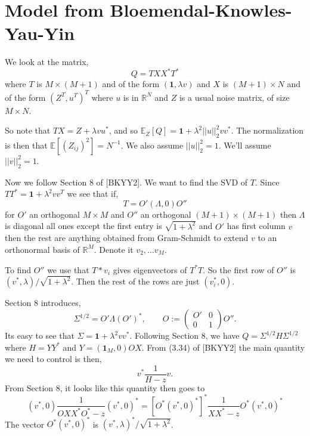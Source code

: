 \documentclass[11 pt, reqno]{article}
\def\beq{\begin{equation}}
\def\eeq{\end{equation}}
\def\rr{\mathbb{R}}
\def\1{\boldsymbol{1}}
\def\ee{\mathrm{E}}
\def\ee{\mathbb{E}}
\begin{document}
\section{Model from Bloemendal-Knowles-Yau-Yin}





We look at the matrix, 
\beq
Q = T X X^* T^*
\eeq
where $T$ is $M \times (M+1)$ and of the form $( \1, \lambda v)$ and $X$ is $(M+1) \times N$ and of the form $(Z^T, u^T)^T$ where $u$ is in $\rr^N$ and $Z$ is a usual noise matrix, of size $M \times N$.  

So note that $TX = Z + \lambda v u^*$, and so $\ee_Z [ Q ] = \1 + \lambda^2 ||u||_2^2 v v^*$.    The normalization is then that $\ee[ (Z_{ij})^2] = N^{-1}$.  We also assume $||u||_2^2 = 1$.  We'll assume $||v||_2^2 = 1$.    

Now we follow Section $8$ of [BKYY2].  We want to find the SVD of $T$.   Since $T T^* = \1 + \lambda^2 v v^T$ we see that if,
\beq
T = O' (\Lambda, 0) O''
\eeq
for $O'$ an orthogonal $M \times M$ and $O''$ an orthogonal $(M+1) \times (M+1)$ then $\Lambda$ is diagonal all ones except the first entry is $\sqrt{1+ \lambda^2}$ and $O'$ has first column $v$ then the rest are anything obtained from Gram-Schmidt to extend $v$ to an orthonormal basis of $\rr^M$.  Denote it $v_2, \dots v_M$.  

To find $O''$ we use that $T* v_i$ gives eigenvectors of $T^* T$.   So the first row of $O''$ is $(v^*, \lambda ) / \sqrt{1+\lambda^2}$.  Then the rest of the rows are just $(v_i^*, 0)$.

Section 8 introduces,
\beq
\Sigma^{1/2} = O' \Lambda (O')^*, \qquad O:= \left( \begin{matrix} O' & 0 \\ 0 & 1 \end{matrix} \right)O''.
\eeq
Its easy to see that $\Sigma = \1 + \lambda^2 v v^*$.  Following Section 8, we have $Q = \Sigma^{1/2} H \Sigma^{1/2}$ where $H = Y Y^*$ and $Y = (\1_M, 0) O X$.  
From (3.34) of [BKYY2] the main quantity we need to control is then,
\beq
v^* \frac{1}{H-z} v.
\eeq
From Section 8, it looks like this quantity then goes to
\beq
(v^*, 0) \frac{1}{ O X X^* O^* - z } (v^*, 0)^* = [ O^* ( v^*, 0)^*]^* \frac{1}{ X X^* - z } O^* ( v^*, 0)^*
\eeq
The vector $O^* (v^*, 0)^*$ is $(v^*, \lambda)^* / \sqrt{1  + \lambda^2}$.  







{}


\begin{comment}
\begin{thebibliography}{9999}
\bibitem[EKYY]{EKYY} Erdos-Knowles-Yau-Yin.  Semicircle for general class




\end{thebibliography}
\end{comment}
\end{document}
